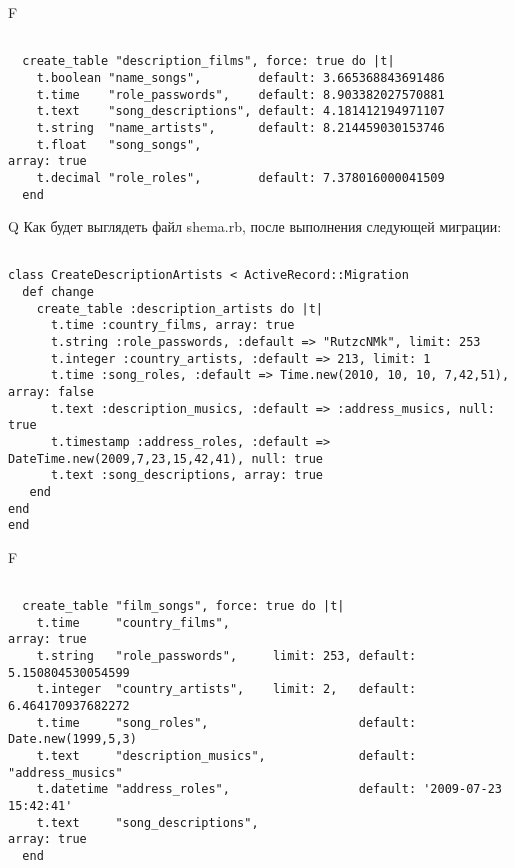 F
\begin{verbatim}

  create_table "description_films", force: true do |t|
    t.boolean "name_songs",        default: 3.665368843691486
    t.time    "role_passwords",    default: 8.903382027570881
    t.text    "song_descriptions", default: 4.181412194971107
    t.string  "name_artists",      default: 8.214459030153746
    t.float   "song_songs",                                                     array: true
    t.decimal "role_roles",        default: 7.378016000041509
  end

\end{verbatim}

Q
Как будет выглядеть файл shema.rb, после выполнения следующей миграции:

\begin{verbatim}

class CreateDescriptionArtists < ActiveRecord::Migration 
  def change 
    create_table :description_artists do |t| 
      t.time :country_films, array: true
      t.string :role_passwords, :default => "RutzcNMk", limit: 253
      t.integer :country_artists, :default => 213, limit: 1
      t.time :song_roles, :default => Time.new(2010, 10, 10, 7,42,51), array: false
      t.text :description_musics, :default => :address_musics, null: true
      t.timestamp :address_roles, :default => DateTime.new(2009,7,23,15,42,41), null: true
      t.text :song_descriptions, array: true
   end
end
end
\end{verbatim}

F
\begin{verbatim}

  create_table "film_songs", force: true do |t|
    t.time     "country_films",                                                  array: true
    t.string   "role_passwords",     limit: 253, default: 5.150804530054599
    t.integer  "country_artists",    limit: 2,   default: 6.464170937682272
    t.time     "song_roles",                     default: Date.new(1999,5,3)
    t.text     "description_musics",             default: "address_musics"
    t.datetime "address_roles",                  default: '2009-07-23 15:42:41'
    t.text     "song_descriptions",                                              array: true
  end

\end{verbatim}

